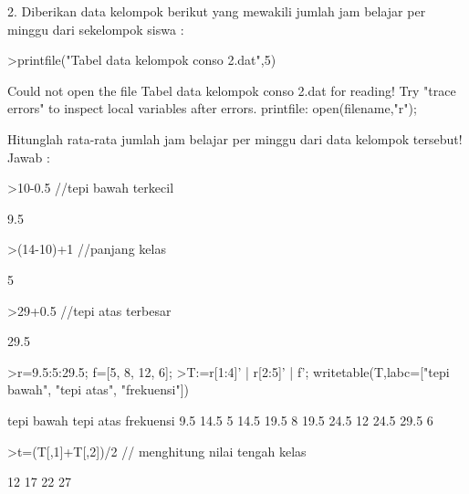 \documentclass[a4paper,10pt]{article}
\begin{document}
\begin{eulernotebook}
\begin{eulercomment}
\begin{eulercomment}
\begin{eulercomment}
\begin{eulercomment}
\begin{eulercomment}
\begin{eulercomment}
\begin{eulercomment}
\begin{eulercomment}
\begin{eulercomment}
\begin{eulercomment}
\begin{eulercomment}
\begin{eulercomment}
\begin{eulercomment}
\begin{eulercomment}
\begin{eulercomment}
2. Diberikan data kelompok berikut yang mewakili jumlah jam belajar
per minggu dari sekelompok siswa :
\end{eulercomment}
\begin{eulerprompt}
>printfile("Tabel data kelompok conso 2.dat",5)
\end{eulerprompt}
\begin{euleroutput}
  Could not open the file
  Tabel data kelompok conso 2.dat
  for reading!
  Try "trace errors" to inspect local variables after errors.
  printfile:
      open(filename,"r");
\end{euleroutput}
\begin{eulercomment}
Hitunglah rata-rata jumlah jam belajar per minggu dari data kelompok
tersebut!\\
Jawab :
\end{eulercomment}
\begin{eulerprompt}
>10-0.5  //tepi bawah terkecil
\end{eulerprompt}
\begin{euleroutput}
  9.5
\end{euleroutput}
\begin{eulerprompt}
>(14-10)+1  //panjang kelas
\end{eulerprompt}
\begin{euleroutput}
  5
\end{euleroutput}
\begin{eulerprompt}
>29+0.5  //tepi atas terbesar
\end{eulerprompt}
\begin{euleroutput}
  29.5
\end{euleroutput}
\begin{eulerprompt}
>r=9.5:5:29.5; f=[5, 8, 12, 6];
>T:=r[1:4]' | r[2:5]' | f'; writetable(T,labc=["tepi bawah", "tepi atas", "frekuensi"])
\end{eulerprompt}
\begin{euleroutput}
   tepi bawah tepi atas frekuensi
          9.5      14.5         5
         14.5      19.5         8
         19.5      24.5        12
         24.5      29.5         6
\end{euleroutput}
\begin{eulerprompt}
>t=(T[,1]+T[,2])/2  // menghitung nilai tengah kelas
\end{eulerprompt}
\begin{euleroutput}
             12 
             17 
             22 
             27 
\end{euleroutput}
\begin{eulerprompt}

\end{eulerprompt}
\end{eulercomment}
\end{eulercomment}
\end{eulercomment}
\end{eulercomment}
\end{eulercomment}
\end{eulercomment}
\end{eulercomment}
\end{eulercomment}
\end{eulercomment}
\end{eulercomment}
\end{eulercomment}
\end{eulercomment}
\end{eulercomment}
\end{eulercomment}
\end{eulernotebook}
\end{document}
